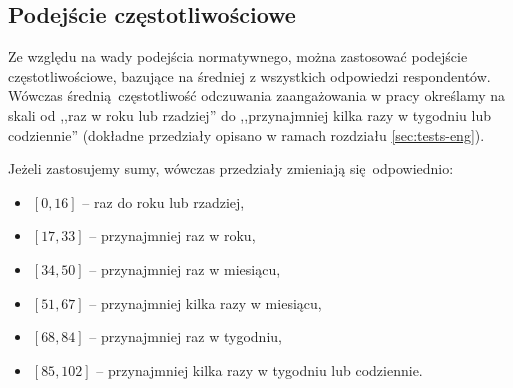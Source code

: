 \subsection{Podejście częstotliwościowe}
Ze względu na wady podejścia normatywnego, można zastosować podejście częstotliwościowe, bazujące na średniej z wszystkich odpowiedzi respondentów. Wówczas średnią częstotliwość odczuwania zaangażowania w pracy określamy na skali od ,,raz w roku lub rzadziej'' do ,,przynajmniej kilka razy w tygodniu lub codziennie'' (dokładne przedziały opisano w ramach rozdziału \ref{sec:tests-eng}).

Jeżeli zastosujemy sumy, wówczas przedziały zmieniają się odpowiednio:
\begin{itemize}
\item $[0, 16]$ -- raz do roku lub rzadziej,
\item $[17, 33]$ -- przynajmniej raz w roku,
\item $[34, 50]$ -- przynajmniej raz w miesiącu,
\item $[51, 67]$ -- przynajmniej kilka razy w miesiącu,
\item $[68, 84]$ -- przynajmniej raz w tygodniu,
\item $[85, 102]$ -- przynajmniej kilka razy w tygodniu lub codziennie. 
\end{itemize}

